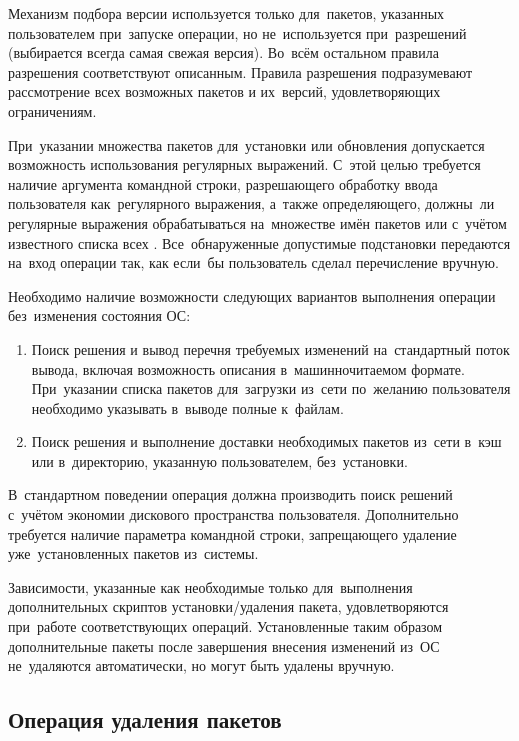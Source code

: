Механизм подбора версии используется только для~пакетов, указанных пользователем при~запуске операции,
но не~используется при~разрешений  (выбирается всегда самая свежая версия).
Во~всём остальном правила разрешения  соответствуют описанным.
Правила разрешения  подразумевают рассмотрение всех возможных пакетов и их~версий, удовлетворяющих ограничениям.

При~указании множества пакетов для~установки или обновления  допускается возможность использования регулярных выражений.
С~этой целью требуется наличие аргумента командной строки,  
разрешающего обработку ввода пользователя как~регулярного выражения,
а~также определяющего,  должны~ли регулярные выражения обрабатываться на~множестве имён пакетов или с~учётом известного списка всех .
Все~обнаруженные допустимые подстановки передаются на~вход операции так, как если~бы пользователь сделал перечисление вручную.

Необходимо наличие возможности следующих вариантов выполнения операции без~изменения состояния ОС:

\begin{enumerate}

\item {
Поиск решения и вывод перечня требуемых изменений на~стандартный поток вывода,
включая возможность описания в~машинночитаемом формате.
При~указании списка пакетов для~загрузки из~сети по~желанию пользователя необходимо указывать в~выводе полные  к~файлам.
}

\item {
Поиск решения и выполнение доставки необходимых пакетов из~сети в~кэш или в~директорию, указанную пользователем, без~установки.
}

\end{enumerate}

В~стандартном поведении операция должна производить поиск решений с~учётом экономии дискового пространства пользователя. 
Дополнительно требуется наличие параметра командной строки, запрещающего удаление уже~установленных пакетов из~системы. 

Зависимости, указанные как необходимые только для~выполнения дополнительных скриптов установки/удаления пакета,
удовлетворяются при~работе соответствующих операций.
Установленные таким образом дополнительные пакеты после завершения внесения изменений из~ОС не~удаляются автоматически,
но могут быть удалены вручную.

\subsection{Операция удаления пакетов}

